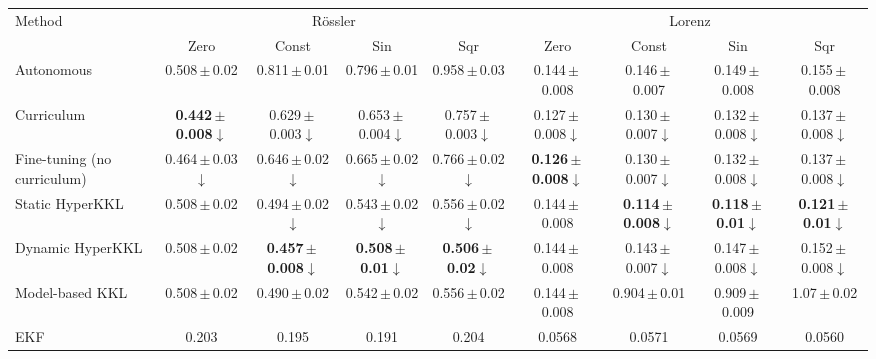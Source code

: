 \begin{tabular}{lcccccccc}
\toprule
Method & \multicolumn{4}{c}{R\"ossler} & \multicolumn{4}{c}{Lorenz} \\
 & Zero & Const & Sin & Sqr & Zero & Const & Sin & Sqr \\
\midrule
Autonomous & 0.508\,$\pm$\,0.02 & 0.811\,$\pm$\,0.01 & 0.796\,$\pm$\,0.01 & 0.958\,$\pm$\,0.03 & 0.144\,$\pm$\,0.008 & 0.146\,$\pm$\,0.007 & 0.149\,$\pm$\,0.008 & 0.155\,$\pm$\,0.008 \\
Curriculum & \textbf{0.442\,$\pm$\,0.008}$\downarrow$ & 0.629\,$\pm$\,0.003$\downarrow$ & 0.653\,$\pm$\,0.004$\downarrow$ & 0.757\,$\pm$\,0.003$\downarrow$ & 0.127\,$\pm$\,0.008$\downarrow$ & 0.130\,$\pm$\,0.007$\downarrow$ & 0.132\,$\pm$\,0.008$\downarrow$ & 0.137\,$\pm$\,0.008$\downarrow$ \\
Fine-tuning (no curriculum) & 0.464\,$\pm$\,0.03$\downarrow$ & 0.646\,$\pm$\,0.02$\downarrow$ & 0.665\,$\pm$\,0.02$\downarrow$ & 0.766\,$\pm$\,0.02$\downarrow$ & \textbf{0.126\,$\pm$\,0.008}$\downarrow$ & 0.130\,$\pm$\,0.007$\downarrow$ & 0.132\,$\pm$\,0.008$\downarrow$ & 0.137\,$\pm$\,0.008$\downarrow$ \\
Static HyperKKL & 0.508\,$\pm$\,0.02 & 0.494\,$\pm$\,0.02$\downarrow$ & 0.543\,$\pm$\,0.02$\downarrow$ & 0.556\,$\pm$\,0.02$\downarrow$ & 0.144\,$\pm$\,0.008 & \textbf{0.114\,$\pm$\,0.008}$\downarrow$ & \textbf{0.118\,$\pm$\,0.01}$\downarrow$ & \textbf{0.121\,$\pm$\,0.01}$\downarrow$ \\
Dynamic HyperKKL & 0.508\,$\pm$\,0.02 & \textbf{0.457\,$\pm$\,0.008}$\downarrow$ & \textbf{0.508\,$\pm$\,0.01}$\downarrow$ & \textbf{0.506\,$\pm$\,0.02}$\downarrow$ & 0.144\,$\pm$\,0.008 & 0.143\,$\pm$\,0.007$\downarrow$ & 0.147\,$\pm$\,0.008$\downarrow$ & 0.152\,$\pm$\,0.008$\downarrow$ \\
\midrule
Model-based KKL & 0.508\,$\pm$\,0.02 & 0.490\,$\pm$\,0.02 & 0.542\,$\pm$\,0.02 & 0.556\,$\pm$\,0.02 & 0.144\,$\pm$\,0.008 & 0.904\,$\pm$\,0.01 & 0.909\,$\pm$\,0.009 & 1.07\,$\pm$\,0.02 \\
EKF & 0.203 & 0.195 & 0.191 & 0.204 & 0.0568 & 0.0571 & 0.0569 & 0.0560 \\
\bottomrule
\end{tabular}

